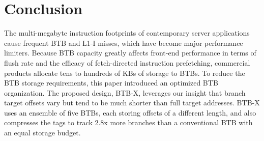 \section{Conclusion}
\label{sec:eval}

The multi-megabyte instruction footprints of contemporary server applications cause frequent BTB and L1-I misses, which have become major performance limiters. Because BTB capacity greatly affects front-end performance in terms of flush rate and the efficacy of fetch-directed instruction prefetching, commercial products allocate tens to hundreds of KBs of storage to BTBs. To reduce the BTB storage requirements, this paper introduced an optimized BTB organization. The proposed design, BTB-X, leverages our insight that branch target offsets vary but tend to be much shorter than full target addresses. BTB-X uses an ensemble of five BTBs, each storing offsets of a different length, and also compresses the tags to track  2.8x more branches than a conventional BTB with an equal storage budget.